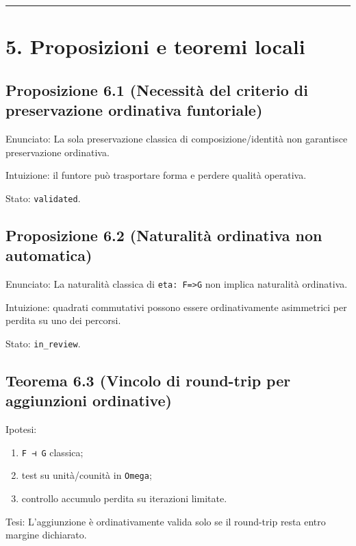 \begin{center}\rule{0.5\linewidth}{0.5pt}\end{center}

\section{5. Proposizioni e teoremi locali}

\subsection{Proposizione 6.1 (Necessità del criterio di preservazione ordinativa funtoriale)}

Enunciato:
La sola preservazione classica di composizione/identità non garantisce preservazione ordinativa.

Intuizione:
il funtore può trasportare forma e perdere qualità operativa.

Stato: \texttt{validated}.

\subsection{Proposizione 6.2 (Naturalità ordinativa non automatica)}

Enunciato:
La naturalità classica di \texttt{eta:\ F=\textgreater{}G} non implica naturalità ordinativa.

Intuizione:
quadrati commutativi possono essere ordinativamente asimmetrici per perdita su uno dei percorsi.

Stato: \texttt{in\_review}.

\subsection{Teorema 6.3 (Vincolo di round-trip per aggiunzioni ordinative)}

Ipotesi:

\begin{enumerate}
\def\labelenumi{\arabic{enumi}.}
\tightlist
\item
  \texttt{F\ ⊣\ G} classica;
\item
  test su unità/counità in \texttt{Omega};
\item
  controllo accumulo perdita su iterazioni limitate.
\end{enumerate}

Tesi:
L'aggiunzione è ordinativamente valida solo se il round-trip resta entro margine dichiarato.

